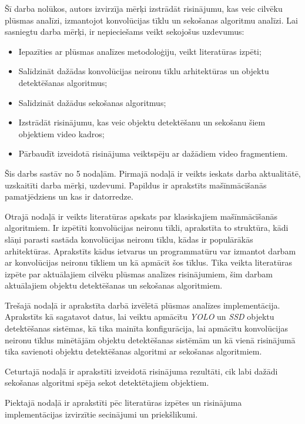 Šī darba nolūkos, autors izvirzīja mērķi izstrādāt risinājumu, kas veic cilvēku plūsmas analīzi, izmantojot konvolūcijas tīklu un sekošanas algoritmu analīzi. Lai sasniegtu darba mērķi, ir nepieciešams veikt sekojošus uzdevumus:
\begin{itemize}
	\item Iepazīties ar plūsmas analīzes metodoloģiju, veikt literatūras izpēti;	
	\item Salīdzināt dažādas konvolūcijas neironu tīklu arhitektūras un objektu detektēšanas algoritmus;
	\item Salīdzināt dažādus sekošanas algoritmus;
	\item Izstrādāt risinājumu, kas veic objektu detektēšanu un sekošanu šiem objektiem video kadros;
	\item Pārbaudīt izveidotā risinājuma veiktspēju ar dažādiem video fragmentiem.	
\end{itemize}

Šis darbs sastāv no 5 nodaļām. Pirmajā nodaļā ir veikts ieskats darba aktualitātē, uzskaitīti darba mērķi, uzdevumi. Papildus ir aprakstīts  mašīnmācīšanās pamatjēdziens un kas ir datorredze.

Otrajā nodaļā ir veikts literatūras apskats par klasiskajiem mašīnmācīšanās algoritmiem. Ir izpētīti konvolūcijas neironu tīkli, aprakstīta to struktūra, kādi slāņi parasti sastāda konvolūcijas neironu tīklu, kādas ir populārākās arhitektūras. Aprakstīts kādus ietvarus un programmatūru
var izmantot darbam ar konvolūcijas neironu tīkliem un kā apmācīt šos tīklus. Tika veikta literatūras izpēte par aktuālajiem cilvēku plūsmas analīzes risinājumiem, šim darbam aktuālajiem objektu detektēšanas un sekošanas algoritmiem.

Trešajā nodaļā ir aprakstīta darbā izvēlētā plūsmas analīzes implementācija. Aprakstīts kā sagatavot datus, lai veiktu apmācītu \textit{YOLO} un \textit{SSD} objektu detektēšanas sistēmas, kā tika mainīta konfigurācija, lai apmācītu konvolūcijas neironu tīklus minētājām objektu detektēšanas sistēmām un kā vienā risinājumā tika savienoti objektu detektēšanas algoritmi ar sekošanas algoritmiem.

Ceturtajā nodaļā ir aprakstīti izveidotā risinājuma rezultāti, cik labi dažādi sekošanas algoritmi spēja sekot detektētajiem objektiem.

Piektajā nodaļā ir aprakstīti pēc literatūras izpētes un risinājuma implementācijas izvirzītie secinājumi un priekšlikumi.
\newpage

